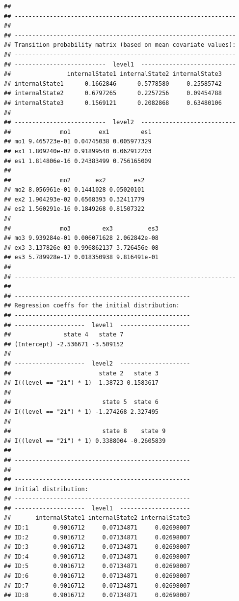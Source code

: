 \documentclass[12pt]{article}\usepackage[]{graphicx}\usepackage[]{color}
\makeatletter
\newenvironment{kframe}{%
 \def\at@end@of@kframe{}%
 \ifinner\ifhmode%
  \def\at@end@of@kframe{\end{minipage}}%
  \begin{minipage}{\columnwidth}%
 \fi\fi%
 \def\FrameCommand##1{\hskip\@totalleftmargin \hskip-\fboxsep
 \colorbox{shadecolor}{##1}\hskip-\fboxsep
     \hskip-\linewidth \hskip-\@totalleftmargin \hskip\columnwidth}%
 \MakeFramed {\advance\hsize-\width
   \@totalleftmargin\z@ \linewidth\hsize
   \@setminipage}}%
 {\par\unskip\endMakeFramed%
 \at@end@of@kframe}
\newenvironment{knitrout}{}{} %
\makeatother
\begin{document}
\begin{knitrout}
\begin{kframe}
\begin{verbatim}
## 
## ---------------------------------------------------------------
## 
## ---------------------------------------------------------------
## Transition probability matrix (based on mean covariate values):
## ---------------------------------------------------------------
## --------------------------  level1  ---------------------------
##                internalState1 internalState2 internalState3
## internalState1      0.1662846      0.5778580     0.25585742
## internalState2      0.6797265      0.2257256     0.09454788
## internalState3      0.1569121      0.2082868     0.63480106
## 
## --------------------------  level2  ---------------------------
##              mo1        ex1         es1
## mo1 9.465723e-01 0.04745038 0.005977329
## ex1 1.809240e-02 0.91899540 0.062912203
## es1 1.814806e-16 0.24383499 0.756165009
## 
##              mo2       ex2        es2
## mo2 8.056961e-01 0.1441028 0.05020101
## ex2 1.904293e-02 0.6568393 0.32411779
## es2 1.560291e-16 0.1849268 0.81507322
## 
##              mo3         ex3          es3
## mo3 9.939284e-01 0.006071628 2.062842e-08
## ex3 3.137826e-03 0.996862137 3.726456e-08
## es3 5.789928e-17 0.018350938 9.816491e-01
## 
## ---------------------------------------------------------------
## 
## --------------------------------------------------
## Regression coeffs for the initial distribution:
## --------------------------------------------------
## --------------------  level1  --------------------
##               state 4   state 7
## (Intercept) -2.536671 -3.509152
## 
## --------------------  level2  --------------------
##                         state 2   state 3
## I((level == "2i") * 1) -1.38723 0.1583617
## 
##                          state 5  state 6
## I((level == "2i") * 1) -1.274268 2.327495
## 
##                          state 8    state 9
## I((level == "2i") * 1) 0.3388004 -0.2605839
## 
## --------------------------------------------------
## 
## --------------------------------------------------
## Initial distribution:
## --------------------------------------------------
## --------------------  level1  --------------------
##       internalState1 internalState2 internalState3
## ID:1       0.9016712     0.07134871     0.02698007
## ID:2       0.9016712     0.07134871     0.02698007
## ID:3       0.9016712     0.07134871     0.02698007
## ID:4       0.9016712     0.07134871     0.02698007
## ID:5       0.9016712     0.07134871     0.02698007
## ID:6       0.9016712     0.07134871     0.02698007
## ID:7       0.9016712     0.07134871     0.02698007
## ID:8       0.9016712     0.07134871     0.02698007

\end{verbatim}
\end{kframe}
\end{knitrout}
\end{document}
